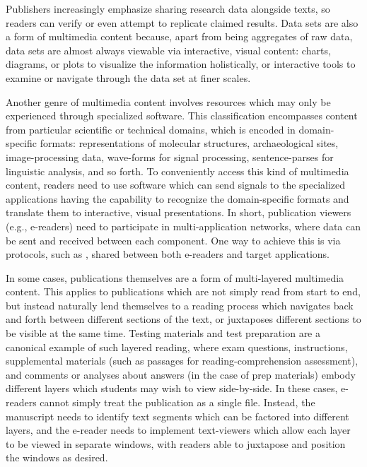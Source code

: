 \documentclass[10pt,letterpaper]{article}
\newcommand{\EPF}{\resizebox{!}{8pt}{\AcronymText{ETSpf}}}
\newcommand{\textscc}[1]{{\color{orr!35!black}{{%
						\fontfamily{Cabin-TLF}\fontseries{b}\selectfont{\textsc{\scriptsize{#1}}}}}}}
\newcommand{\AcronymText}[1]{{\textscc{#1}}}
\newcommand{\q}[1]{{\fontfamily{qcr}\selectfont ``}#1{\fontfamily{qcr}\selectfont ''}}
\newcommand{\mnotel}[1]{%
\vspace*{-2em}
\reversemarginpar
\raisebox{-4em}{\marginnote{\parbox{4em}{%
\begin{mdframed}[innerleftmargin=4pt,
	innerrightmargin=1pt,innertopmargin=1pt,
	linecolor=red!20!cyan,userdefinedwidth=4em,
	topline=false,
	rightline=false]
{{\fontfamily{ppl}\fontsize{12}{0}\selectfont
		\textit{#1}}}
\end{mdframed}}
	}[3em]}}
\begin{document}
{{\begin{description}[leftmargin=2pt,
	labelindent=-2pt,labelsep=12pt,itemsep=13pt]
\item[Data Sets and Data Visualization]  Publishers 
increasingly emphasize sharing research data alongside 
texts, so readers can verify or even attempt to 
replicate claimed results.  Data sets are also a form 
of multimedia content because, apart from being aggregates 
of raw data, data sets are almost always viewable 
via interactive, visual content: charts, diagrams, or 
plots to visualize the information holistically, or 
interactive tools to examine or navigate through the 
data set at finer scales.  

\item[Application Networks]  Another genre of multimedia 
content involves resources which may only be experienced 
through specialized software.  This classification encompasses 
content from particular scientific or technical domains, 
which is encoded in domain-specific formats: representations 
of molecular structures, archaeological sites, image-processing 
data, wave-forms for signal processing, sentence-parses for 
linguistic analysis, and so forth.  To conveniently access 
this kind of multimedia content, readers need to use software 
which can send signals to the specialized applications 
having the capability to recognize the domain-specific 
formats and translate them to interactive, 
visual presentations.  In short, publication viewers 
(e.g., e-readers) need to participate in multi-application 
networks, where data can be sent and received between 
each component.  One way to achieve this is via 
protocols, such as \EPF{}, shared between both e-readers and 
target applications.

\vspace*{-3em}
\mnotel{\\\q{Multi-Layered} reading}
\item[Publications-as-Applications]  In some 
cases, publications themselves are a form of 
multi-layered multimedia content.  This applies 
to publications which are not simply read from 
start to end, but instead naturally lend 
themselves to a reading process which navigates 
back and forth between different sections of 
the text, or juxtaposes different sections to be 
visible at the same time.  Testing materials 
and test preparation are a canonical example 
of such layered reading, where exam questions, 
instructions, supplemental materials (such 
as passages for reading-comprehension 
assessment), and comments or analyses about 
answers (in the case of prep materials) 
embody different layers which 
students may wish to view side-by-side.  
In these cases, e-readers cannot simply 
treat the publication as a single file.  
Instead, the manuscript needs 
to identify text segments which can be factored 
into different layers, and the e-reader 
needs to implement text-viewers which allow 
each layer to be viewed in separate windows, 
with readers able to juxtapose and position the 
windows as desired. 
\end{description}\vspace{-2em}
}


}
\end{document}
